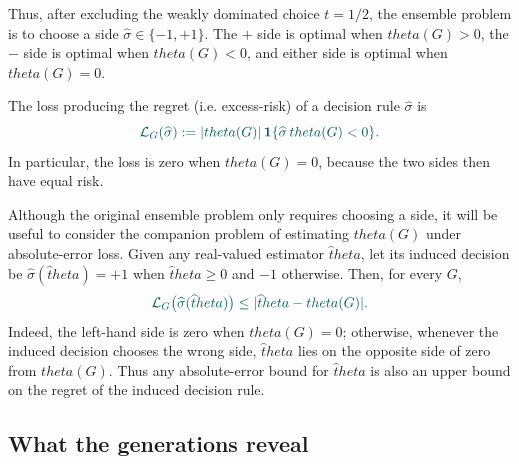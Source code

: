 \documentclass[11pt]{article}
\def\theta{theta}%
\newcommand{\one}{\mathbf 1}
\newcommand\aed[1]{{\color{magenta!60!black} #1}}
\newcommand\ced[1]{{\color{teal!70!black} #1}}
\begin{document}
Thus, after excluding the weakly dominated choice $t=1/2$, the ensemble problem is to choose a side $\widehat\sigma\in\{-1,+1\}$.  The $+$ side is optimal when $\theta(G)>0$, the $-$ side is optimal when $\theta(G)<0$, and either side is optimal when $\theta(G)=0$.  %

\aed{The loss producing the regret (i.e. excess-risk)} of a decision rule $\widehat\sigma$ is
\begin{equation}
\label{eq:scalar-decision-loss}
\ced{\mathcal L_G(\widehat\sigma)
:=
|\theta(G)|\,
\one\{\widehat\sigma\,\theta(G)<0\}.}
\end{equation}
\ced{In particular, the loss is zero when $\theta(G)=0$, because the two sides then have equal risk.}

\ced{Although the original ensemble problem only requires choosing a side, it will be useful to consider the companion problem of estimating $\theta(G)$ under absolute-error loss.  Given any real-valued estimator $\widehat\theta$, let its induced decision be $\widehat\sigma(\widehat\theta)=+1$ when $\widehat\theta\ge0$ and $-1$ otherwise.}
\ced{Then, for every $G$,}
\begin{equation}
\label{eq:pointwise-decision-reduction}
\ced{\mathcal L_G\bigl(\widehat\sigma(\widehat\theta)\bigr)
\le
|\widehat\theta-\theta(G)|.}
\end{equation}
Indeed, the left-hand side is zero when $\theta(G)=0$; otherwise, whenever the induced decision chooses the wrong side, $\widehat\theta$ lies on the opposite side of zero from $\theta(G)$.  \ced{Thus any absolute-error bound for $\widehat\theta$ is also an upper bound on the regret of the induced decision rule.}  %

\subsection{What the generations reveal}
\end{document}

